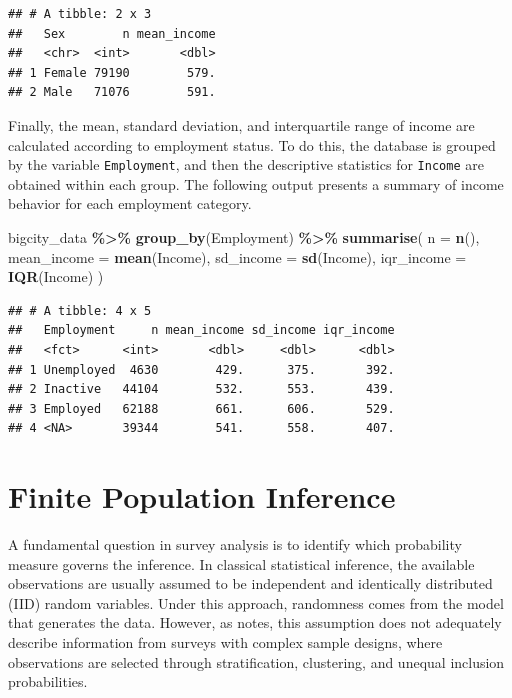 \documentclass[
  english,
  12pt,
]{book}
\newenvironment{Shaded}{\begin{snugshade}}{\end{snugshade}}
\newcommand{\AttributeTok}[1]{\textcolor[rgb]{0.13,0.29,0.53}{#1}}
\newcommand{\FunctionTok}[1]{\textcolor[rgb]{0.13,0.29,0.53}{\textbf{#1}}}
\newcommand{\NormalTok}[1]{#1}
\newcommand{\SpecialCharTok}[1]{\textcolor[rgb]{0.81,0.36,0.00}{\textbf{#1}}}
\begin{document}
\begin{verbatim}
## # A tibble: 2 x 3
##   Sex        n mean_income
##   <chr>  <int>       <dbl>
## 1 Female 79190        579.
## 2 Male   71076        591.
\end{verbatim}

Finally, the mean, standard deviation, and interquartile range of income are calculated according to employment status. To do this, the database is grouped by the variable \texttt{Employment}, and then the descriptive statistics for \texttt{Income} are obtained within each group. The following output presents a summary of income behavior for each employment category.

\begin{Shaded}
\begin{Highlighting}[]
\NormalTok{bigcity\_data }\SpecialCharTok{\%\textgreater{}\%}
  \FunctionTok{group\_by}\NormalTok{(Employment) }\SpecialCharTok{\%\textgreater{}\%}
  \FunctionTok{summarise}\NormalTok{(}
    \AttributeTok{n =} \FunctionTok{n}\NormalTok{(),}
    \AttributeTok{mean\_income =} \FunctionTok{mean}\NormalTok{(Income),}
    \AttributeTok{sd\_income =} \FunctionTok{sd}\NormalTok{(Income),}
    \AttributeTok{iqr\_income =} \FunctionTok{IQR}\NormalTok{(Income)}
\NormalTok{  )}
\end{Highlighting}
\end{Shaded}

\begin{verbatim}
## # A tibble: 4 x 5
##   Employment     n mean_income sd_income iqr_income
##   <fct>      <int>       <dbl>     <dbl>      <dbl>
## 1 Unemployed  4630        429.      375.       392.
## 2 Inactive   44104        532.      553.       439.
## 3 Employed   62188        661.      606.       529.
## 4 <NA>       39344        541.      558.       407.
\end{verbatim}

\chapter{Finite Population Inference}\label{ap2}

A fundamental question in survey analysis is to identify which probability measure governs the inference. In classical statistical inference, the available observations are usually assumed to be independent and identically distributed (IID) random variables. Under this approach, randomness comes from the model that generates the data. However, as \citet{kish1987statistical} notes, this assumption does not adequately describe information from surveys with complex sample designs, where observations are selected through stratification, clustering, and unequal inclusion probabilities.
\end{document}
